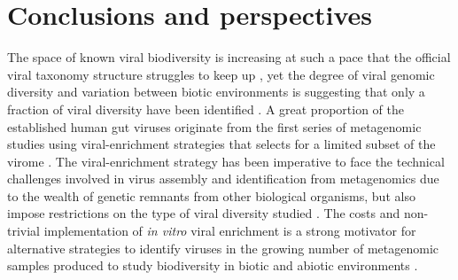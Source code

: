 \chapter{Conclusions and perspectives}
The space of known viral biodiversity is increasing at such a pace that the official viral taxonomy structure struggles to keep up \cite{Adriaenssens2020-gb}, yet the degree of viral genomic diversity and variation between biotic environments is suggesting that only a fraction of viral diversity have been identified \cite{Dance_undated-vk}. A great proportion of the established human gut viruses originate from the first series of metagenomic studies using viral-enrichment strategies that selects for a limited subset of the virome \cite{Norman2015-eb,Clooney2019-nn,Manrique2016-vq,Gogokhia2019-li,Shkoporov2019-mk}. The viral-enrichment strategy has been imperative to face the technical challenges involved in virus assembly and identification from metagenomics due to the wealth of genetic remnants from other biological organisms, but also impose restrictions on the type of viral diversity studied \cite{Roux2019-dc,Gregory2020-gu}.  The costs and non-trivial implementation of \textit{in vitro} viral enrichment is a strong motivator for alternative strategies to identify viruses in the growing number of metagenomic samples produced to study biodiversity in biotic and abiotic environments \cite{Wooley2010-mr}.\\ 


